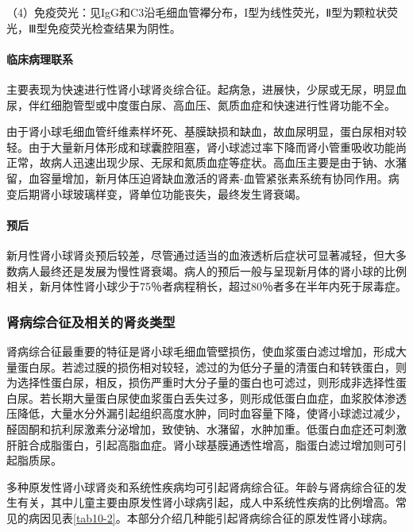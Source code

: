（4）免疫荧光：见IgG和C3沿毛细血管襻分布，I型为线性荧光，Ⅱ型为颗粒状荧光，Ⅲ型免疫荧光检查结果为阴性。

\paragraph{临床病理联系}
主要表现为快速进行性肾小球肾炎综合征。起病急，进展快，少尿或无尿，明显血尿，伴红细胞管型或中度蛋白尿、高血压、氮质血症和快速进行性肾功能不全。

由于肾小球毛细血管纤维素样坏死、基膜缺损和缺血，故血尿明显，蛋白尿相对较轻。由于大量新月体形成和球囊腔阻塞，肾小球滤过率下降而肾小管重吸收功能尚正常，故病人迅速出现少尿、无尿和氮质血症等症状。高血压主要是由于钠、水潴留，血容量增加，新月体压迫肾缺血激活的肾素-血管紧张素系统有协同作用。病变后期肾小球玻璃样变，肾单位功能丧失，最终发生肾衰竭。

\paragraph{预后}
新月性肾小球肾炎预后较差，尽管通过适当的血液透析后症状可显著减轻，但大多数病人最终还是发展为慢性肾衰竭。病人的预后一般与呈现新月体的肾小球的比例相关，新月体性肾小球少于75％者病程稍长，超过80％者多在半年内死于尿毒症。

\subsubsection{肾病综合征及相关的肾炎类型}

肾病综合征最重要的特征是肾小球毛细血管壁损伤，使血浆蛋白滤过增加，形成大量蛋白尿。若滤过膜的损伤相对较轻，滤过的为低分子量的清蛋白和转铁蛋白，则为选择性蛋白尿，相反，损伤严重时大分子量的蛋白也可滤过，则形成非选择性蛋白尿。若长期大量蛋白尿使血浆蛋白丢失过多，则形成低蛋白血症，血浆胶体渗透压降低，大量水分外漏引起组织高度水肿，同时血容量下降，使肾小球滤过减少，醛固酮和抗利尿激素分泌增加，致使钠、水潴留，水肿加重。低蛋白血症还可刺激肝脏合成脂蛋白，引起高脂血症。肾小球基膜通透性增高，脂蛋白滤过增加则可引起脂质尿。

多种原发性肾小球肾炎和系统性疾病均可引起肾病综合征。年龄与肾病综合征的发生有关，其中儿童主要由原发性肾小球病引起，成人中系统性疾病的比例增高。常见的病因见表\ref{tab10-2}。本部分介绍几种能引起肾病综合征的原发性肾小球病。

